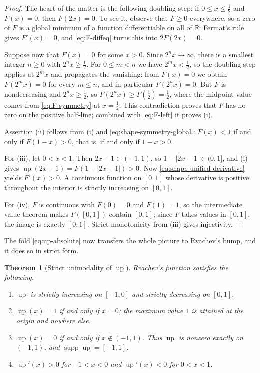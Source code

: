 \documentclass[11pt,oneside]{article}
\newtheorem{theorem}{Theorem}[section]
\theoremstyle{definition}
\theoremstyle{remark}
\newcommand{\R}{\mathbb R}
\newcommand{\Up}{\operatorname{up}}
\newcommand{\supp}{\operatorname{supp}}
\begin{document}
\begin{proof}
The heart of the matter is the following doubling step: if $0\le x\le\tfrac12$ and $F(x)=0$,
then $F(2x)=0$.  To see it, observe that $F\ge0$ everywhere, so a zero of $F$ is a global
minimum of a function differentiable on all of $\R$; Fermat's rule gives $F'(x)=0$, and
\eqref{eq:F-diffeq} turns this into $2F(2x)=0$.

Suppose now that $F(x)=0$ for some $x>0$.  Since $2^nx\to\infty$, there is a smallest
integer $n\ge0$ with $2^nx\ge\tfrac12$.  For $0\le m<n$ we have $2^mx<\tfrac12$, so the
doubling step applies at $2^mx$ and propagates the vanishing: from $F(x)=0$ we obtain
$F(2^mx)=0$ for every $m\le n$, and in particular $F(2^nx)=0$.  But $F$ is nondecreasing and
$2^nx\ge\tfrac12$, so $F(2^nx)\ge F(\tfrac12)=\tfrac12$, where the midpoint value comes from
\eqref{eq:F-symmetry} at $x=\tfrac12$.  This contradiction proves that $F$ has no zero on the
positive half-line; combined with \eqref{eq:F-left} it proves (i).

Assertion (ii) follows from (i) and \eqref{eq:shape-symmetry-global}: $F(x)<1$ if and only if
$F(1-x)>0$, that is, if and only if $1-x>0$.

For (iii), let $0<x<1$.  Then $2x-1\in(-1,1)$, so $1-|2x-1|\in(0,1]$, and (i) gives
$\Up(2x-1)=F(1-|2x-1|)>0$.  Now \eqref{eq:shape-unified-derivative} yields $F'(x)>0$.  A
continuous function on $[0,1]$ whose derivative is positive throughout the interior is
strictly increasing on $[0,1]$.

For (iv), $F$ is continuous with $F(0)=0$ and $F(1)=1$, so the intermediate value theorem
makes $F([0,1])$ contain $[0,1]$; since $F$ takes values in $[0,1]$, the image is exactly
$[0,1]$.  Strict monotonicity from (iii) gives injectivity.
\end{proof}

The fold \eqref{eq:up-absolute} now transfers the whole picture to Rvachev's bump, and it
does so in strict form.

\begin{theorem}[Strict unimodality of $\Up$]
\label{thm:shape-unimodal}
Rvachev's function satisfies the following.
\begin{enumerate}
\item $\Up$ is strictly increasing on $[-1,0]$ and strictly decreasing on $[0,1]$.
\item $\Up(x)=1$ if and only if $x=0$; the maximum value $1$ is attained at the origin and
      nowhere else.
\item $\Up(x)=0$ if and only if $x\notin(-1,1)$.  Thus $\Up$ is nonzero exactly on
      $(-1,1)$, and $\supp\Up=[-1,1]$.
\item $\Up'(x)>0$ for $-1<x<0$ and $\Up'(x)<0$ for $0<x<1$.
\end{enumerate}
\end{theorem}
\end{document}
